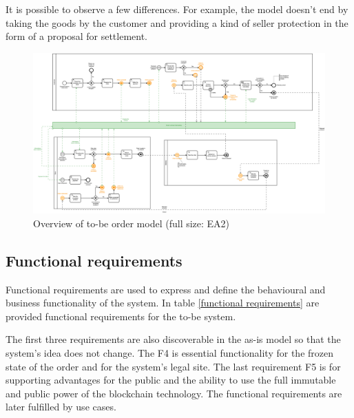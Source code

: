 \documentclass[thesis=M,english]{FITthesis}[2019/12/23]
\begin{document}
It is possible to observe a few differences. For example, the model doesn't end by taking the goods by the customer and providing a kind of seller protection in the form of a proposal for settlement. 

% 


\begin{figure}[ht!]
    \centering
    \includegraphics[width=\textwidth]{assets/to-beProcessModel.png}
    \caption{Overview of to-be order model  (full size: EA2)}
    \label{fig:ToBeOrderModel}
\end{figure}

\label{functionalRequirements}
\subsection{Functional requirements}

Functional requirements are used to express and define the behavioural and business functionality of the system. In table \ref{functional requirements} are provided functional requirements for the to-be system.

The first three requirements are also discoverable in the as-is model so that the system's idea does not change. The F4 is essential functionality for the frozen state of the order and for the system's legal site. The last requirement F5 is for supporting advantages for the public and the ability to use the full immutable and public power of the blockchain technology.
The functional requirements are later fulfilled by use cases.

%
\end{document}

